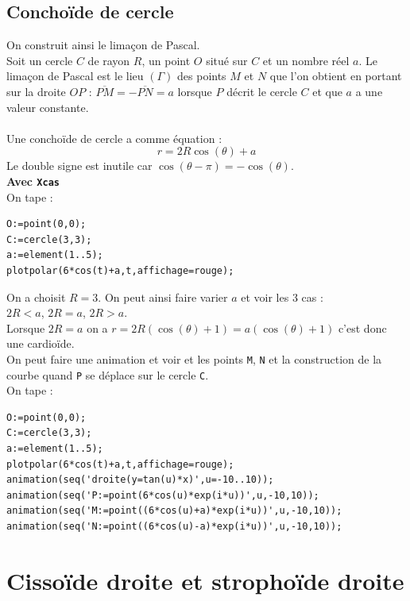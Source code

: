 \documentclass[a4paper,11pt]{book}
\begin{document}
\subsection{Concho\"{i}de de cercle}
On construit ainsi le lima\c{c}on de Pascal.\\
Soit un cercle $C$ de rayon $R$, un point $O$ situ\'e sur $C$ et un nombre 
r\'eel $a$. Le lima\c{c}on de Pascal est le
lieu $(\Gamma)$ des points $M$ et $N$ que l'on obtient en portant sur la 
droite $OP$ : $\overline{PM}=-\overline{PN}=a$ lorsque $P$ d\'ecrit le cercle 
$C$ et que $a$ a une valeur constante.\\\\
Une concho\"{i}de de cercle a comme \'equation :\\
$$r=2R\cos(\theta)+a$$
Le double signe est inutile car $\cos(\theta-\pi)=-\cos(\theta)$.\\
{\bf Avec {\tt Xcas}}\\
On tape :\\
\begin{verbatim}
O:=point(0,0);
C:=cercle(3,3);
a:=element(1..5);
plotpolar(6*cos(t)+a,t,affichage=rouge);
\end{verbatim}
On a choisit $R=3$. On peut ainsi faire varier $a$ et voir les 3 cas :\\
$2R<a$, $2R=a$, $2R>a$.\\

Lorsque $2R=a$ on a $r=2R(\cos(\theta)+1)=a(\cos(\theta)+1)$ c'est donc une 
cardio\"{i}de.\\
On peut faire une animation et voir et les points {\tt M}, {\tt N} et la 
construction de la courbe quand {\tt P} se d\'eplace sur le cercle {\tt C}.\\
On tape :
\begin{verbatim}
O:=point(0,0);
C:=cercle(3,3);
a:=element(1..5);
plotpolar(6*cos(t)+a,t,affichage=rouge);
animation(seq('droite(y=tan(u)*x)',u=-10..10));
animation(seq('P:=point(6*cos(u)*exp(i*u))',u,-10,10));
animation(seq('M:=point((6*cos(u)+a)*exp(i*u))',u,-10,10));
animation(seq('N:=point((6*cos(u)-a)*exp(i*u))',u,-10,10));
\end{verbatim}

\section{Cisso\"{i}de droite et stropho\"{i}de droite}
\end{document}
